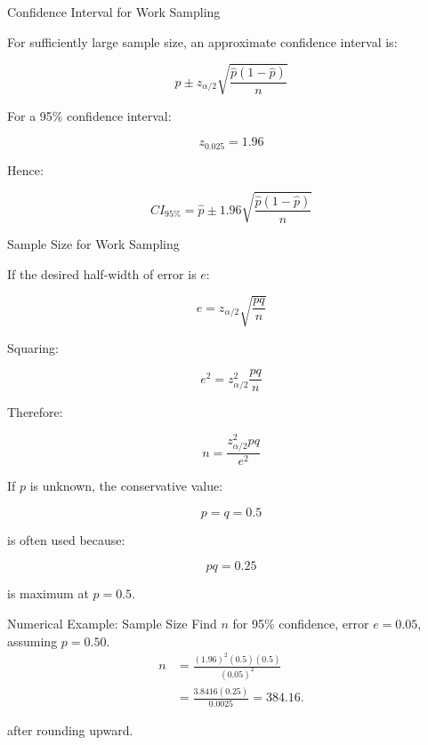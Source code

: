 \documentclass[aspectratio=169,10pt]{beamer}
\begin{document}

\begin{frame}[shrink=18]{Confidence Interval for Work Sampling}
\small

For sufficiently large sample size, an approximate confidence interval is:

\[
\boxed{
\hat p
\pm
z_{\alpha/2}
\sqrt{
\frac{\hat p(1-\hat p)}{n}
}
}
\]

For a 95\% confidence interval:

\[
z_{0.025}=1.96
\]

Hence:

\[
\boxed{
CI_{95\%}
=
\hat p
\pm
1.96
\sqrt{
\frac{\hat p(1-\hat p)}{n}
}
}
\]

\end{frame}


\begin{frame}[shrink=18]{Sample Size for Work Sampling}
\small

If the desired half-width of error is \(e\):

\[
e=
z_{\alpha/2}
\sqrt{
\frac{pq}{n}
}
\]

Squaring:

\[
e^2=
z_{\alpha/2}^2
\frac{pq}{n}
\]

Therefore:

\[
\boxed{
n=
\frac{
z_{\alpha/2}^2pq
}{
e^2
}
}
\]

If \(p\) is unknown, the conservative value:

\[
p=q=0.5
\]

is often used because:

\[
pq=0.25
\]

is maximum at \(p=0.5\).

\end{frame}


\begin{frame}{Numerical Example: Sample Size}
\small
Find $n$ for 95\% confidence, error $e=0.05$, assuming $p=0.50$.
\[
\begin{aligned}
n&=\frac{(1.96)^2(0.5)(0.5)}{(0.05)^2}\\
 &=\frac{3.8416(0.25)}{0.0025}=384.16.
\end{aligned}
\]
\begin{center}\end{center}
after rounding upward.
\end{frame}
\end{document}
